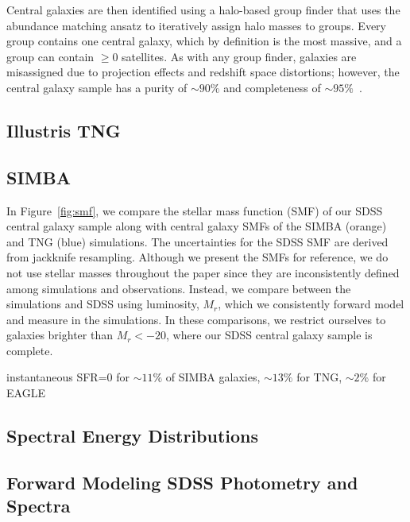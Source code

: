Central galaxies are then identified using a halo-based group finder that uses
the abundance matching ansatz to iteratively  assign halo masses to groups.
Every group contains one central galaxy, which by definition is the most
massive, and a group can contain $\ge0$ satellites. As with any group finder,
galaxies are misassigned due to projection effects and redshift space
distortions; however, the central galaxy sample has a purity of ${\sim}90\%$
and completeness of ${\sim}95\%$~\citep{tinker2018}. 

\subsection{Illustris TNG} \label{sec:tng}

\subsection{SIMBA} \label{sec:simba}

In Figure~\ref{fig:smf}, we compare the stellar mass function (SMF) of our SDSS
central galaxy sample along with central galaxy SMFs of the SIMBA (orange) and
TNG (blue) simulations. The uncertainties for the SDSS SMF are derived from
jackknife resampling. Although we present the SMFs for reference, we do not use
stellar masses throughout the paper since they are inconsistently defined among
simulations and observations. Instead, we compare between the simulations and
SDSS using luminosity, $M_r$, which we consistently forward model and measure
in the simulations. In these comparisons, we restrict ourselves to galaxies
brighter than $M_r < -20$, where our SDSS central galaxy sample is complete. 

instantaneous SFR=0 for $\sim11\%$ of SIMBA galaxies, $\sim13\%$ for TNG,
$\sim2\%$ for EAGLE

\subsection{Spectral Energy Distributions} \label{sec:sed}

\subsection{Forward Modeling SDSS Photometry and Spectra} \label{sec:fm} 



